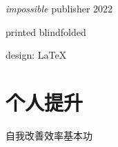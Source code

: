 \documentclass{book}        %
\date{}
\begin{document}
\begin{titlepage}\thispagestyle{empty} \vspace*{3em}{\centering\Huge A++ 敏捷开发小手册 \par}\clearpage
\newpage \thispagestyle{empty} \mbox{} \cleardoublepage
\thispagestyle{empty} \cleardoublepage

\thispagestyle{empty} \vspace*{\fill} \parbox{.8\textwidth}{\raggedright \scriptsize
\textit{impossible} publisher 2022

printed blindfolded

design: \LaTeX
}
\end{titlepage}
\clearpage \thispagestyle{empty}\cleardoublepage
\newpage %


\tableofcontents %

















\part{个人提升}自我改善效率基本功\\
\end{document}
